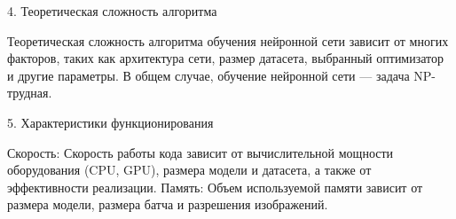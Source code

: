  4. Теоретическая сложность алгоритма

Теоретическая сложность алгоритма  обучения  нейронной  сети  зависит  от  многих  факторов,  таких  как  архитектура  сети,  размер  датасета,  выбранный  оптимизатор  и  другие  параметры.  В  общем  случае,  обучение  нейронной  сети  —  задача  NP-трудная.  

 5. Характеристики  функционирования

Скорость: Скорость  работы  кода  зависит  от  вычислительной  мощности  оборудования  (CPU,  GPU),  размера  модели  и  датасета,  а  также  от  эффективности  реализации.
Память: Объем  используемой  памяти  зависит  от  размера  модели,  размера  батча  и  разрешения  изображений.

\newpage

